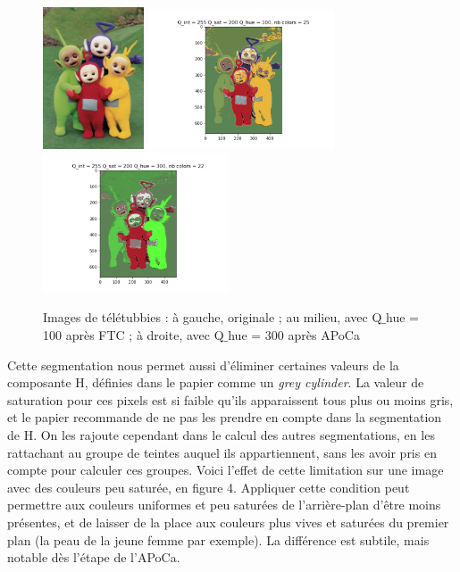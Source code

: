 \documentclass{article}
\begin{document}
\begin{figure}[h]
    \centering
    \includegraphics[width=3cm]{teletubbies.jpg}
    \includegraphics[width=5.5cm]{fig3_milieu.png}
    \includegraphics[width=5.5cm]{fig3_droite.png}
    \caption{Images de télétubbies : à gauche, originale ; au milieu, avec Q$\_$hue = 100 après FTC ; à droite, avec Q$\_$hue = 300 après APoCa}
\end{figure}

Cette segmentation nous permet aussi d'éliminer certaines valeurs de la composante H, définies dans le papier comme un {\it grey cylinder}. La valeur de saturation pour ces pixels est si faible qu'ils apparaissent tous plus ou moins gris, et le papier recommande de ne pas les prendre en compte dans la segmentation de H. On les rajoute cependant dans le calcul des autres segmentations, en les rattachant au groupe de teintes auquel ils appartiennent, sans les avoir pris en compte pour calculer ces groupes. Voici l'effet de cette limitation sur une image avec des couleurs peu saturée, en figure 4. Appliquer cette condition peut permettre aux couleurs uniformes et peu saturées de l'arrière-plan d'être moins présentes, et de laisser de la place aux couleurs plus vives et saturées du premier plan (la peau de la jeune femme par exemple). La différence est subtile, mais notable dès l'étape de l'APoCa.\\
\end{document}
